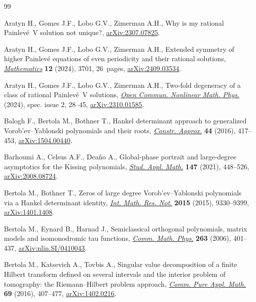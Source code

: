 \begin{thebibliography}{99}
\footnotesize\itemsep=0pt

Aratyn H., Gomes J.F., Lobo G.V., Zimerman A.H., Why is my rational
 Painlev\'e~V solution not unique?,
 \href{http://arxiv.org/abs/2307.07825}{arXiv:2307.07825}.

Aratyn H., Gomes J.F., Lobo G.V., Zimerman A.H., Extended symmetry of higher
 Painlev\'e equations of even periodicity and their rational solutions,
 \href{https://doi.org/10.3390/math12233701}{\textit{Mathematics}} \textbf{12}
 (2024), 3701, 26~pages,
 \href{http://arxiv.org/abs/2409.03534}{arXiv:2409.03534}.

Aratyn H., Gomes J.F., Lobo G.V., Zimerman A.H., Two-fold degeneracy of a class
 of rational {P}ainlev\'e~{V} solutions,
 \href{https://doi.org/10.46298/ocnmp.13201}{\textit{Open Commun. Nonlinear
 Math. Phys.}} (2024), spec. issue 2, 28--45,
 \href{http://arxiv.org/abs/2310.01585}{arXiv:2310.01585}.

Balogh F., Bertola M., Bothner T., Hankel determinant approach to generalized
 {V}orob'ev--{Y}ablonski polynomials and their roots,
 \href{https://doi.org/10.1007/s00365-016-9328-4}{\textit{Constr. Approx.}}
 \textbf{44} (2016), 417--453,
 \href{http://arxiv.org/abs/1504.00440}{arXiv:1504.00440}.

Barhoumi A., Celsus A.F., Dea\~{n}o A., Global-phase portrait and large-degree
 asymptotics for the {K}issing polynomials,
 \href{https://doi.org/10.1111/sapm.12387}{\textit{Stud. Appl. Math.}}
 \textbf{147} (2021), 448--526,
 \href{http://arxiv.org/abs/2008.08724}{arXiv:2008.08724}.

Bertola M., Bothner T., Zeros of large degree {V}orob'ev--{Y}ablonski
 polynomials via a {H}ankel determinant identity,
 \href{https://doi.org/10.1093/imrn/rnu239}{\textit{Int. Math. Res. Not.}}
 \textbf{2015} (2015), 9330--9399,
 \href{http://arxiv.org/abs/1401.1408}{arXiv:1401.1408}.

Bertola M., Eynard B., Harnad J., Semiclassical orthogonal polynomials, matrix
 models and isomonodromic tau functions,
 \href{https://doi.org/10.1007/s00220-005-1505-4}{\textit{Comm. Math. Phys.}}
 \textbf{263} (2006), 401--437,
 \href{http://arxiv.org/abs/nlin.SI/0410043}{arXiv:nlin.SI/0410043}.

Bertola M., Katsevich A., Tovbis A., Singular value decomposition of a finite
 {H}ilbert transform defined on several intervals and the interior problem of
 tomography: the {R}iemann--{H}ilbert problem approach,
 \href{https://doi.org/10.1002/cpa.21547}{\textit{Comm. Pure Appl. Math.}}
 \textbf{69} (2016), 407--477,
 \href{http://arxiv.org/abs/1402.0216}{arXiv:1402.0216}.


\end{thebibliography}
